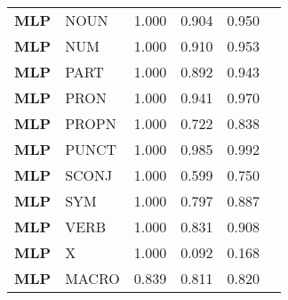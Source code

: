 \begin{table}
\begin{tabular}{|l|l|l|l|l|l|}
\textbf{MLP} & NOUN & 1.000 & 0.904 & 0.950 \\
\textbf{MLP} & NUM & 1.000 & 0.910 & 0.953 \\
\textbf{MLP} & PART & 1.000 & 0.892 & 0.943 \\
\textbf{MLP} & PRON & 1.000 & 0.941 & 0.970 \\
\textbf{MLP} & PROPN & 1.000 & 0.722 & 0.838 \\
\textbf{MLP} & PUNCT & 1.000 & 0.985 & 0.992 \\
\textbf{MLP} & SCONJ & 1.000 & 0.599 & 0.750 \\
\textbf{MLP} & SYM & 1.000 & 0.797 & 0.887 \\
\textbf{MLP} & VERB & 1.000 & 0.831 & 0.908 \\
\textbf{MLP} & X & 1.000 & 0.092 & 0.168 \\
\textbf{MLP} & MACRO & 0.839 & 0.811 & 0.820 \\
\bottomrule
\end{tabular}
\end{table}
